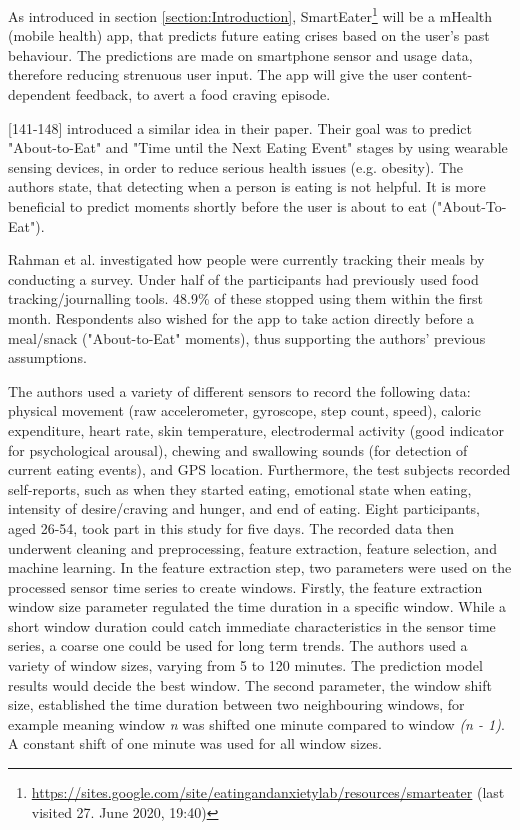 
As introduced in section \ref{section:Introduction}, SmartEater\footnote{\url{https://sites.google.com/site/eatingandanxietylab/resources/smarteater} (last visited 27. June 2020, 19:40)} will be a mHealth (mobile health) app, that predicts future eating crises based on the user's past behaviour. The predictions are made on smartphone sensor and usage data, therefore reducing strenuous user input. The app will give the user content-dependent feedback, to avert a food craving episode. 

\textcite{AboutToEat2016Rahman}[141-148] introduced a similar idea in their paper. Their goal was to predict "About-to-Eat" and "Time until the Next Eating Event" stages by using wearable sensing devices, in order to reduce serious health issues (e.g. obesity). The authors state, that detecting when a person is eating is not helpful. It is more beneficial to predict moments shortly before the user is about to eat ("About-To-Eat").

Rahman et al. investigated how people were currently tracking their meals by conducting a survey. Under half of the participants had previously used food tracking/journalling tools. 48.9\% of these stopped using them within the first month. Respondents also  wished for the app to take action directly before a meal/snack ("About-to-Eat" moments), thus supporting the authors' previous assumptions.

The authors used a variety of different sensors to record the following data: physical movement (raw accelerometer, gyroscope, step count, speed), caloric expenditure, heart rate, skin temperature, electrodermal activity (good indicator for psychological arousal), chewing and swallowing sounds (for detection of current eating events), and GPS location. Furthermore, the test subjects recorded self-reports, such as when they started eating, emotional state when eating, intensity of desire/craving and hunger, and end of eating. Eight participants, aged 26-54, took part in this study for five days. The recorded data then underwent cleaning and preprocessing, feature extraction, feature selection, and machine learning. 
In the feature extraction step, two parameters were used on the processed sensor time series to create windows. Firstly, the feature extraction window size parameter regulated the time duration in a specific window. While a short window duration could catch immediate characteristics in the sensor time series, a coarse one could be used for long term trends. The authors used a variety of window sizes, varying from 5 to 120 minutes. The prediction model results would decide the best window. The second parameter, the window shift size, established the time duration between two neighbouring windows, for example meaning window \textit{n} was shifted one minute compared to window \textit{(n - 1)}. A constant shift of one minute was used for all window sizes. 

